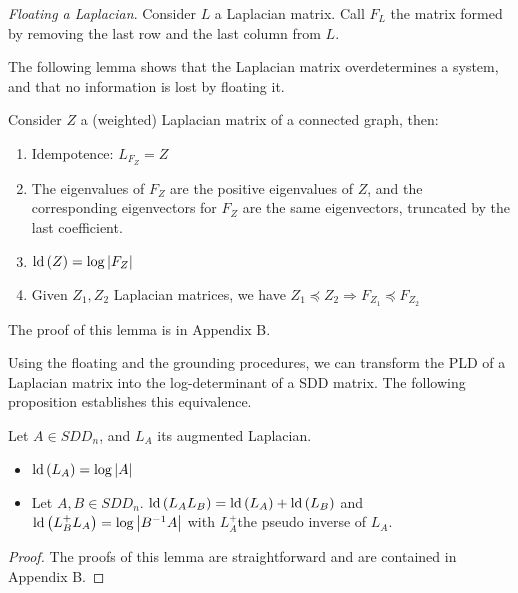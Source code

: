 \begin{definition}\emph{Floating a Laplacian}. Consider $L$ a Laplacian
matrix. Call $F_{L}$ the matrix formed by removing the last row and
the last column from $L$.

\end{definition}

The following lemma shows that the Laplacian matrix overdetermines
a system, and that no information is lost by floating it.

\begin{lemma}\label{lem:floating-properties}Consider $Z$ a (weighted)
Laplacian matrix of a connected graph, then: 
\begin{enumerate}
\item Idempotence: $L_{F_{Z}}=Z$ 
\item The eigenvalues of $F_{Z}$ are the positive eigenvalues of $Z$,
and the corresponding eigenvectors for $F_{Z}$ are the same eigenvectors,
truncated by the last coefficient. 
\item $\text{\textnormal{ld}}\left(Z\right)=\log\left|F_{Z}\right|$ 
\item Given $Z_{1},Z_{2}$ Laplacian matrices, we have $Z_{1}\preceq Z_{2}\Rightarrow F_{Z_{1}}\preceq F_{Z_{2}}$ 
\end{enumerate}
\end{lemma}

The proof of this lemma is in Appendix B.

Using the floating and the grounding procedures, we can transform
the PLD of a Laplacian matrix into the log-determinant of a SDD matrix.
The following proposition establishes this equivalence.

\begin{lemma} \label{pro:pld-properties}Let $A\in SDD_{n}$, and
$L_{A}$ its augmented Laplacian. 
\begin{itemize}
\item $\text{\textnormal{ld}}\left(L_{A}\right)=\log\left|A\right|$ 
\item Let $A,B\in SDD_{n}$. $\text{\textnormal{ld}}\left(L_{A}L_{B}\right)=\text{\textnormal{ld}}\left(L_{A}\right)+\text{\textnormal{ld}}\left(L_{B}\right)$
and $\text{\textnormal{ld}}\left(L_{B}^{+}L_{A}\right)=\log\left|B^{-1}A\right|$ with
$L_{A}^{+}$the pseudo inverse of $L_{A}$. 
\end{itemize}
\end{lemma}

\begin{proof}The proofs of this lemma are straightforward and are
contained in Appendix B. \end{proof}


